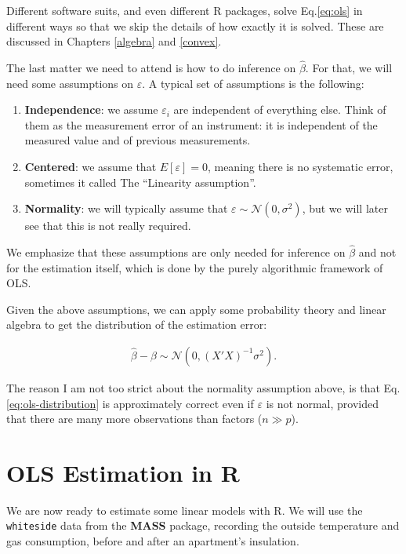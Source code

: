 \documentclass[]{book}
\providecommand{\tightlist}{%
  \setlength{\itemsep}{0pt}\setlength{\parskip}{0pt}}
\theoremstyle{definition}
\theoremstyle{definition}
\theoremstyle{definition}
\theoremstyle{remark}
\begin{document}
Different software suits, and even different R packages, solve
Eq.\eqref{eq:ols} in different ways so that we skip the details of how
exactly it is solved. These are discussed in Chapters \ref{algebra} and
\ref{convex}.

The last matter we need to attend is how to do inference on
\(\hat \beta\). For that, we will need some assumptions on
\(\varepsilon\). A typical set of assumptions is the following:

\begin{enumerate}
\def\labelenumi{\arabic{enumi}.}
\tightlist
\item
  \textbf{Independence}: we assume \(\varepsilon_i\) are independent of
  everything else. Think of them as the measurement error of an
  instrument: it is independent of the measured value and of previous
  measurements.
\item
  \textbf{Centered}: we assume that \(E[\varepsilon]=0\), meaning there
  is no systematic error, sometimes it called The ``Linearity
  assumption''.
\item
  \textbf{Normality}: we will typically assume that
  \(\varepsilon \sim \mathcal{N}(0,\sigma^2)\), but we will later see
  that this is not really required.
\end{enumerate}

We emphasize that these assumptions are only needed for inference on
\(\hat \beta\) and not for the estimation itself, which is done by the
purely algorithmic framework of OLS.

Given the above assumptions, we can apply some probability theory and
linear algebra to get the distribution of the estimation error:

\begin{align}
  \hat \beta - \beta \sim \mathcal{N}(0, (X'X)^{-1} \sigma^2).
  \label{eq:ols-distribution}
\end{align}

The reason I am not too strict about the normality assumption above, is
that Eq.\eqref{eq:ols-distribution} is approximately correct even if
\(\varepsilon\) is not normal, provided that there are many more
observations than factors (\(n \gg p\)).

\section{OLS Estimation in R}\label{ols-estimation-in-r}

We are now ready to estimate some linear models with R. We will use the
\texttt{whiteside} data from the \textbf{MASS} package, recording the
outside temperature and gas consumption, before and after an apartment's
insulation.
\end{document}
